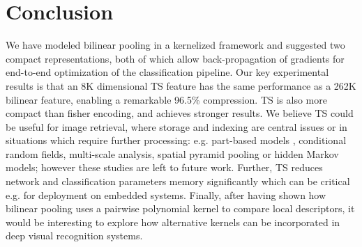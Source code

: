 \documentclass[10pt,twocolumn,letterpaper]{article}
\begin{document}
\section{Conclusion}
We have modeled bilinear pooling in a kernelized framework and suggested two compact representations, both of which allow back-propagation of gradients for end-to-end optimization of the classification pipeline. Our key experimental results is that an 8K dimensional TS feature has the same performance as a 262K bilinear feature, enabling a remarkable 96.5\% compression. TS is also more compact than fisher encoding, and achieves stronger results. We believe TS could be useful for image retrieval, where storage and indexing are central issues or in situations which require further processing: e.g. part-based models \cite{Felzenszwalb_2010_Object}, conditional random fields, multi-scale analysis, spatial pyramid pooling or hidden Markov models; however these studies are left to future work. Further, TS reduces network and classification parameters memory significantly which can be critical e.g. for deployment on embedded systems. Finally, after having shown how bilinear pooling uses a pairwise polynomial kernel to compare local descriptors, it would be interesting to explore how alternative kernels can be incorporated in deep visual recognition systems.
{\small

}
\end{document}
